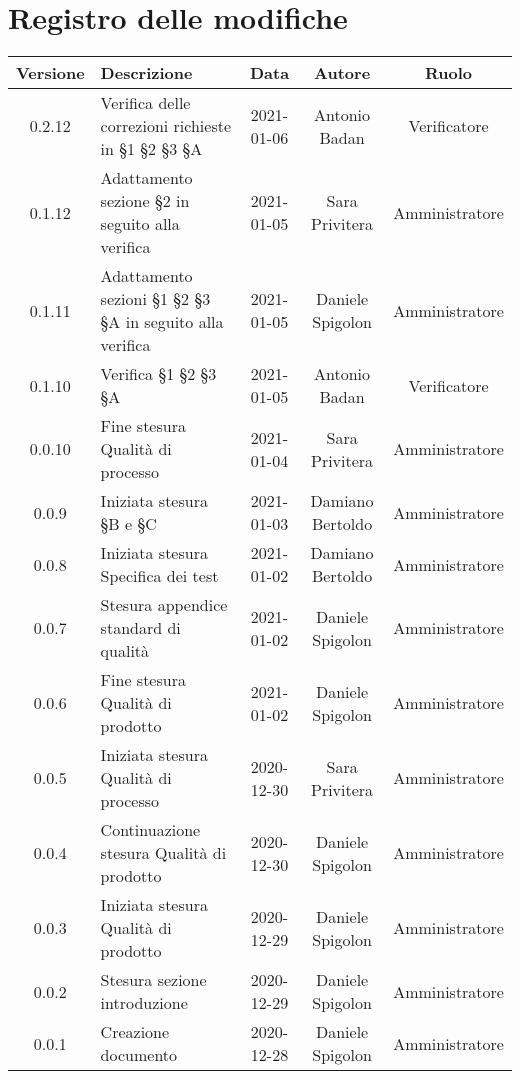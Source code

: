 \section*{Registro delle modifiche}

\begin{center}
	\begin{longtable}{|c|p{5cm}|c|c|c|}
	\hline
	\rowcolor{lighter-grayer}
	\textbf{Versione} & \textbf{Descrizione} & \textbf{Data} & \textbf{Autore} & \textbf{Ruolo} \\
	\hline
	\endfirsthead

	\hline
	0.2.12 & Verifica delle correzioni richieste in §1 §2 §3 §A & 2021-01-06 & Antonio Badan & Verificatore \\
	0.1.12 & Adattamento sezione §2 in seguito alla verifica & 2021-01-05 & Sara Privitera & Amministratore \\
	\hline
	0.1.11 & Adattamento sezioni §1 §2 §3 §A in seguito alla verifica & 2021-01-05 & Daniele Spigolon & Amministratore \\
	\hline
	0.1.10 & Verifica §1 §2 §3 §A & 2021-01-05 & Antonio Badan & Verificatore \\
	\hline
	0.0.10 & Fine stesura Qualità di processo & 2021-01-04 & Sara Privitera & Amministratore \\
	\hline
	0.0.9 & Iniziata stesura §B e §C & 2021-01-03 & Damiano Bertoldo & Amministratore \\
	\hline
	0.0.8 & Iniziata stesura Specifica dei test & 2021-01-02 & Damiano Bertoldo & Amministratore \\
	\hline
	0.0.7 & Stesura appendice standard di qualità & 2021-01-02 & Daniele Spigolon & Amministratore \\
	\hline
	0.0.6 & Fine stesura Qualità di prodotto & 2021-01-02 & Daniele Spigolon & Amministratore \\
	\hline
	0.0.5 & Iniziata stesura Qualità di processo & 2020-12-30 & Sara Privitera & Amministratore \\
	\hline
	0.0.4 & Continuazione stesura Qualità di prodotto & 2020-12-30 & Daniele Spigolon & Amministratore \\
	\hline
	0.0.3 & Iniziata stesura Qualità di prodotto & 2020-12-29 & Daniele Spigolon & Amministratore \\
	\hline
	0.0.2 & Stesura sezione introduzione & 2020-12-29 & Daniele Spigolon & Amministratore \\
	\hline
	0.0.1 & Creazione documento & 2020-12-28 & Daniele Spigolon & Amministratore \\
	\hline

	\end{longtable}
\end{center}